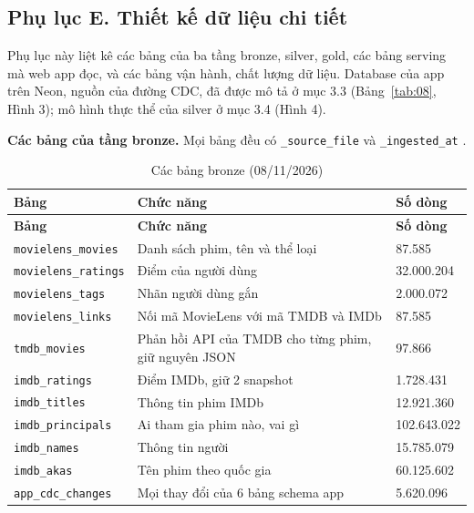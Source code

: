 \documentclass[a4paper,11pt]{article}
\newlength{\reporttablewidth}
\newcommand{\dbsep}{\_\allowbreak}
\begin{document}
\subsection*{Phụ lục E. Thiết kế dữ liệu chi tiết}

Phụ lục này liệt kê các bảng của ba tầng bronze, silver, gold, các bảng serving mà web app đọc, và các bảng vận hành, chất lượng dữ liệu. Database của app trên Neon, nguồn của đường CDC, đã được mô tả ở mục 3.3 (Bảng~\ref{tab:08}, Hình 3); mô hình thực thể của silver ở mục 3.4 (Hình 4).

\textbf{Các bảng của tầng bronze.} Mọi bảng đều có \texttt{\dbsep{}source\dbsep{}file} và \texttt{\dbsep{}ingested\dbsep{}at} .

\begingroup
\small
{}
\setlength{\tabcolsep}{4pt}
\renewcommand{\arraystretch}{1.18}
\setlength{\reporttablewidth}{\dimexpr\linewidth-4\tabcolsep\relax}
\begin{longtable}{@{}L{0.32\reporttablewidth} L{0.51\reporttablewidth} L{0.17\reporttablewidth}@{}}
\caption[Các bảng bronze (Phụ lục E)]{Các bảng bronze (08/11/2026)}\label{tab:26} \\
\toprule
\textbf{Bảng} & \textbf{Chức năng} & \textbf{Số dòng} \\
\midrule
\endfirsthead
\toprule
\textbf{Bảng} & \textbf{Chức năng} & \textbf{Số dòng} \\
\midrule
\endhead
\midrule
\endfoot
\bottomrule
\endlastfoot
\texttt{movielens\dbsep{}movies} & Danh sách phim, tên và thể loại & 87.585 \\
\texttt{movielens\dbsep{}ratings} & Điểm của người dùng & 32.000.204 \\
\texttt{movielens\dbsep{}tags} & Nhãn người dùng gắn & 2.000.072 \\
\texttt{movielens\dbsep{}links} & Nối mã MovieLens với mã TMDB và IMDb & 87.585 \\
\texttt{tmdb\dbsep{}movies} & Phản hồi API của TMDB cho từng phim, giữ nguyên JSON & 97.866 \\
\texttt{imdb\dbsep{}ratings} & Điểm IMDb, giữ 2 snapshot & 1.728.431 \\
\texttt{imdb\dbsep{}titles} & Thông tin phim IMDb & 12.921.360 \\
\texttt{imdb\dbsep{}principals} & Ai tham gia phim nào, vai gì & 102.643.022 \\
\texttt{imdb\dbsep{}names} & Thông tin người & 15.785.079 \\
\texttt{imdb\dbsep{}akas} & Tên phim theo quốc gia & 60.125.602 \\
\texttt{app\dbsep{}cdc\dbsep{}changes} & Mọi thay đổi của 6 bảng schema app & 5.620.096 \\
\end{longtable}
\endgroup
\end{document}
